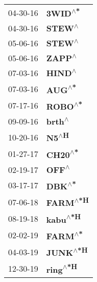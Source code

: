 \begin{supertabular}{p{0.08\textwidth}p{0.2\textwidth}}
 04-30-16 &   \textbf{3WID\textsuperscript{$\wedge$*}} \\
 04-30-16 &    \textbf{STEW\textsuperscript{$\wedge$}} \\
 05-06-16 &    \textbf{STEW\textsuperscript{$\wedge$}} \\
 05-06-16 &    \textbf{ZAPP\textsuperscript{$\wedge$}} \\
 07-03-16 &    \textbf{HIND\textsuperscript{$\wedge$}} \\
 07-03-16 &    \textbf{AUG\textsuperscript{$\wedge$*}} \\
 07-17-16 &   \textbf{ROBO\textsuperscript{$\wedge$*}} \\
 09-09-16 &    \textbf{brth\textsuperscript{$\wedge$}} \\
 10-20-16 &     \textbf{N5\textsuperscript{$\wedge$H}} \\
 01-27-17 &   \textbf{CH20\textsuperscript{$\wedge$*}} \\
 02-19-17 &     \textbf{OFF\textsuperscript{$\wedge$}} \\
 03-17-17 &    \textbf{DBK\textsuperscript{$\wedge$*}} \\
 07-06-18 &  \textbf{FARM\textsuperscript{$\wedge$*H}} \\
 08-19-18 &  \textbf{kabu\textsuperscript{$\wedge$*H}} \\
 02-02-19 &   \textbf{FARM\textsuperscript{$\wedge$*}} \\
 04-03-19 &  \textbf{JUNK\textsuperscript{$\wedge$*H}} \\
 12-30-19 &  \textbf{ring\textsuperscript{$\wedge$*H}} \\
\end{supertabular}
